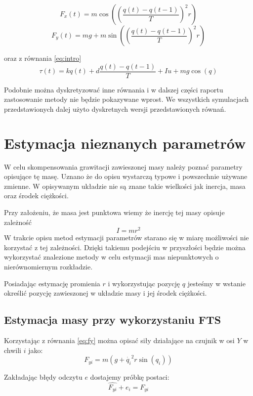 \documentclass[a4paper, 10pt]{article}
\begin{document}
\begin{equation}
F_x(t) = m\cos{((\frac{q(t)-q(t-1)}{T})^2 r)}
\end{equation}
\begin{equation}
\label{eq:fy}
F_y(t) = mg + m\sin{((\frac{q(t)-q(t-1)}{T})^2 r)}
\end{equation}

oraz z równania \ref{eq:intro}
\begin{equation}
\tau(t) = kq(t) + d\frac{q(t)-q(t-1)}{T} + Iu + mg\cos(q)
\end{equation}

Podobnie można dyskretyzować inne równania i w dalszej części raportu zastosowanie metody nie będzie pokazywane wprost. We wszystkich symulacjach przedstawionych dalej użyto dyskretnych wersji przedstawionych równań.

\section{Estymacja nieznanych parametrów}
W celu skompensowania grawitacji zawieszonej masy należy poznać parametry opisujące tę masę. Uznano że do opisu wystarczą typowe i powszechnie używane zmienne. W opisywanym układzie nie są znane takie wielkości jak inercja, masa oraz środek ciężkości. 

Przy założeniu, że masa jest punktowa wiemy że inercję tej masy opisuje zależność
\begin{equation}
I = mr^2
\end{equation}
W trakcie opisu metod estymacji parametrów starano się w miarę możliwości nie korzystać z tej zależności. Dzięki takiemu podejściu w przyszłości będzie można wykorzystać znalezione metody w celu estymacji mas niepunktowych o nierównomiernym rozkładzie. 

Posiadając estymację promienia $r$ i wykorzystując pozycję $q$ jesteśmy w wstanie określić pozycję zawieszonej w układzie masy i jej środek ciężkości.


\subsection{Estymacja masy przy wykorzystaniu FTS}
\label{sec:ftsods}
Korzystając z równania \ref{eq:fy} można opisać siły działające na czujnik w osi $Y$ w chwili $i$ jako:
\begin{equation}
F_{yi}  = m(g + \dot{q_i}^2r\sin{(q_i)})
\end{equation}

Zakładając błędy odczytu $e$ dostajemy próbkę postaci:
\begin{equation}
\hat{F_{yi}}+e_i  = F_{yi}
\end{equation}
\end{document}

